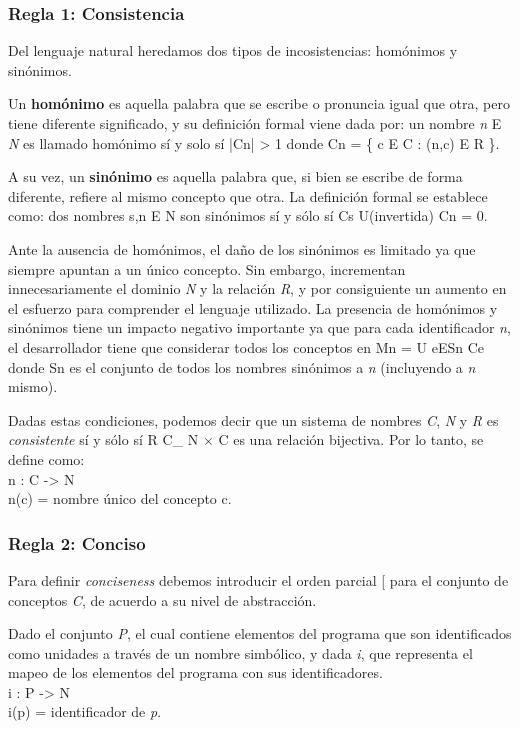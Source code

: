 \subsubsection{Regla 1: Consistencia}
Del lenguaje natural heredamos dos tipos de incosistencias: homónimos y sinónimos.

Un \textbf{homónimo} es aquella palabra que se escribe o pronuncia igual que otra, pero tiene diferente significado, y su definición formal viene dada por: un nombre \textit{n} E \textit{N} es llamado homónimo sí y solo sí |Cn| > 1 donde Cn = \{ c E C : (n,c) E R \}.

A su vez, un \textbf{sinónimo} es aquella palabra que, si bien se escribe de forma diferente, refiere al mismo concepto que otra. La definición formal se establece como: dos nombres s,n E N son sinónimos sí y sólo sí Cs U(invertida) Cn =\/ 0.

Ante la ausencia de homónimos, el daño de los sinónimos es limitado ya que siempre apuntan a un único concepto. Sin embargo, incrementan innecesariamente el dominio \textit{N} y la relación \textit{R}, y por consiguiente un aumento en el esfuerzo para comprender el lenguaje utilizado. La presencia de homónimos y sinónimos tiene un impacto negativo importante ya que para cada identificador \textit{n}, el desarrollador tiene que considerar todos los conceptos en
Mn = U eESn Ce
donde Sn es el conjunto de todos los nombres sinónimos a \textit{n} (incluyendo a \textit{n} mismo).

Dadas estas condiciones, podemos decir que un sistema de nombres \textit{C}, \textit{N} y \textit{R} es \textit{consistente} sí y sólo sí R C\_ N $\times$ C es una relación bijectiva. Por lo tanto, se define como:
\\n : C -> N
\\n(c) = nombre único del concepto c.

\subsubsection{Regla 2: Conciso}
Para definir \textit{conciseness} debemos introducir el orden parcial [ para el conjunto de conceptos \textit{C}, de acuerdo a su nivel de abstracción.

Dado el conjunto \textit{P}, el cual contiene elementos del programa que son identificados como unidades a través de un nombre simbólico, y dada \textit{i}, que representa el mapeo de los elementos del programa con sus identificadores.
\\i : P -> N
\\i(p) = identificador de \textit{p}.

